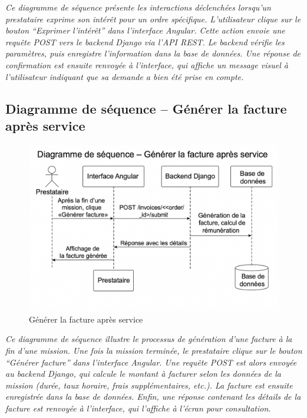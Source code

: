 \textit{Ce diagramme de séquence présente les interactions déclenchées lorsqu’un prestataire exprime son intérêt pour un ordre spécifique. L’utilisateur clique sur le bouton “Exprimer l’intérêt” dans l’interface Angular. Cette action envoie une requête POST vers le backend Django via l’API REST. Le backend vérifie les paramètres, puis enregistre l’information dans la base de données. Une réponse de confirmation est ensuite renvoyée à l’interface, qui affiche un message visuel à l’utilisateur indiquant que sa demande a bien été prise en compte.}


\subsection*{Diagramme de séquence – Générer la facture après service}
\begin{figure}[H]
\centering
\includegraphics[width=0.85\linewidth]{figures/facture seq.png}
\caption{Générer la facture après service}
\end{figure}

\textit{Ce diagramme de séquence illustre le processus de génération d’une facture à la fin d’une mission. Une fois la mission terminée, le prestataire clique sur le bouton “Générer facture” dans l’interface Angular. Une requête POST est alors envoyée au backend Django, qui calcule le montant à facturer selon les données de la mission (durée, taux horaire, frais supplémentaires, etc.). La facture est ensuite enregistrée dans la base de données. Enfin, une réponse contenant les détails de la facture est renvoyée à l’interface, qui l’affiche à l’écran pour consultation.}


